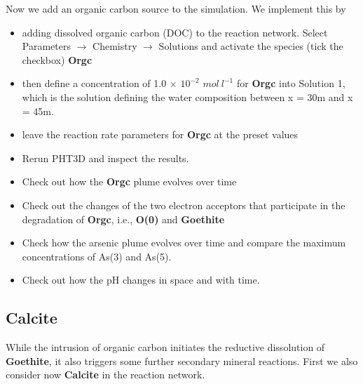 Now we add an organic carbon source to the simulation. We implement this by  

\begin{itemize}

\item adding dissolved organic carbon (DOC) to the reaction network. Select Parameters $\rightarrow$ Chemistry $\rightarrow$ Solutions and 
activate the species (tick the checkbox) {\color{red} \textbf{Orgc}} 

\item then define a concentration of 1.0 $\times$ $10^{-2}$ $mol\ l^{-1}$ for {\color{red}\textbf{Orgc}} into Solution 1, which is the solution defining the water composition between x = 30m and x = 45m.

\item leave the reaction rate parameters for {\color{red} \textbf{Orgc}} at the preset values

\item Rerun PHT3D and inspect the results. 

\item Check out how the {\color{red} \textbf{Orgc}} plume evolves over time

\item Check out the changes of the two electron acceptors that participate in the 
degradation of {\color{red} \textbf{Orgc}}, i.e., {\color{red} \textbf{O(0)}} 
and {\color{red} \textbf{Goethite}}

\item Check how the arsenic plume evolves over time and compare the maximum 
concentrations of As(3) and As(5).

\item Check out how the pH changes in space and with time.


\end{itemize}

\subsection[Calcite]{Calcite} 

While the intrusion of organic carbon initiates the reductive dissolution of {\color{red} \textbf{Goethite}}, it also triggers some further secondary mineral reactions. First we also consider now {\color{red} \textbf{Calcite}} in the reaction network. 

